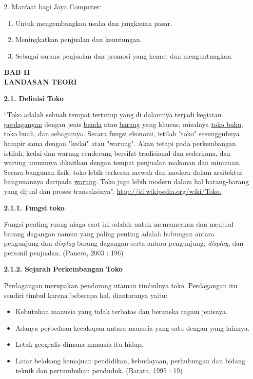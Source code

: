 \documentclass[11pt]{article}
\begin{document}
2. Manfaat bagi Jaya Computer:

\begin{enumerate}
	\item Untuk mengembangkan usaha dan jangkauan pasar.
	\item Meningkatkan penjualan dan keuntungan.
	\item Sebagai sarana penjualan dan promosi yang hemat dan menguntungkan.
\end{enumerate}

\newpage

\begin{center}
\textbf{BAB II
\\
LANDASAN TEORI}
\end{center}

\textbf{2.1. Definisi Toko}

``Toko adalah sebuah tempat tertutup yang di dalamnya terjadi kegiatan
\href{http://id.wikipedia.org/wiki/Perdagangan}{perdagangan} dengan jenis
\href{http://id.wikipedia.org/wiki/Benda}{benda} atau
\href{http://id.wikipedia.org/wiki/Barang}{barang} yang khusus, misalnya
\href{http://id.wikipedia.org/wiki/Toko\_buku}{toko buku}, toko
\href{http://id.wikipedia.org/wiki/Buah}{buah}, dan sebagainya. Secara fungsi
ekonomi, istilah "toko" sesungguhnya hampir sama dengan "kedai" atau "warung".
Akan tetapi pada perkembangan istilah, kedai dan warung cenderung bersifat
tradisional dan sederhana, dan warung umumnya dikaitkan dengan tempat penjualan
makanan dan minuman. Secara bangunan fisik, toko lebih terkesan mewah dan modern
dalam arsitektur bangunannya daripada
\href{http://id.wikipedia.org/wiki/Warung}{warung}. Toko juga lebih modern dalam
hal barang-barang yang dijual dan proses transaksinya''.
\uline{http://id.wikipedia.org/wiki/Toko.}

\textbf{2.1.1. Fungsi toko}

Fungsi penting ruang niaga saat ini adalah untuk memamerkan dan menjual barang
dagangan namun yang paling penting adalah hubungan antara pengunjung dan
\textit{display} barang dagangan serta antara pengunjung, \textit{display}, dan~
personil penjualan. (Panero, 2003 : 196)

\textbf{2.1.2. Sejarah Perkembangan Toko}

Perdagangan merupakan pendorong utaman timbulnya toko. Perdagangan itu sendiri
timbul karena beberapa hal, diantaranya yaitu:

\begin{itemize}
	\item Kebutuhan manusia yang tidak terbatas dan beraneka ragam jenisnya.
	\item Adanya perbedaan kecakapan antara manusia yang satu dengan yang lainnya.
	\item Letak geografis dimana manusia itu hidup.
	\item 

Latar belakang kemajuan pendidikan, kebudayaan, perhubungan dan bidang teknik
dan pertumbuhan penduduk. (Barata, 1995 : 19)
\end{itemize}
\end{document}
